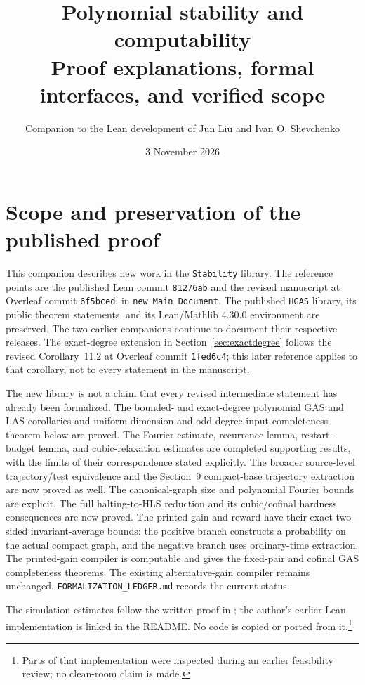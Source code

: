 \documentclass[11pt]{article}
\title{Polynomial stability and computability\\
\large Proof explanations, formal interfaces, and verified scope}
\author{Companion to the Lean development of Jun Liu and Ivan O. Shevchenko}
\date{3 November 2026}
\newcommand{\code}[1]{{\small\nolinkurl{#1}}}
\begin{document}
\maketitle

\section{Scope and preservation of the published proof}

This companion describes new work in the \code{Stability} library. The
reference points are the published Lean commit \code{81276ab} and the
revised manuscript \cite{paper} at Overleaf commit \code{6f5bced}, in
\texttt{new Main Document}. The published \code{HGAS} library, its public
theorem statements, and its Lean/Mathlib 4.30.0 environment are preserved.
The two earlier companions continue to document their respective releases.
The exact-degree extension in Section~\ref{sec:exactdegree} follows the
revised Corollary~11.2 at Overleaf commit \code{1fed6c4}; this later
reference applies to that corollary, not to every statement in the manuscript.

The new library is not a claim that every revised intermediate statement
has already been formalized. The bounded- and exact-degree polynomial GAS and LAS
corollaries and uniform dimension-and-odd-degree-input completeness theorem below
are proved. The Fourier estimate, recurrence lemma, restart-budget lemma,
and cubic-relaxation estimates are completed supporting results, with the limits of
their correspondence stated explicitly. The broader source-level
trajectory/test equivalence and the Section~9 compact-base trajectory
extraction are now proved as well. The canonical-graph size and polynomial
Fourier bounds are explicit. The full halting-to-HLS reduction and its
cubic/cofinal hardness consequences are now proved. The printed gain and
reward have their exact two-sided invariant-average bounds: the positive
branch constructs a probability on the actual compact graph, and the
negative branch uses ordinary-time extraction. The printed-gain compiler
is computable and gives the fixed-pair and cofinal GAS completeness
theorems. The existing alternative-gain compiler remains unchanged.
\code{FORMALIZATION_LEDGER.md} records the current status.

The simulation estimates follow the written proof in \cite{korda}; the
author's earlier Lean implementation is linked in the README. No code is
copied or ported from it.\footnote{Parts of that implementation were inspected
during an earlier feasibility review; no clean-room claim is made.}
\end{document}
